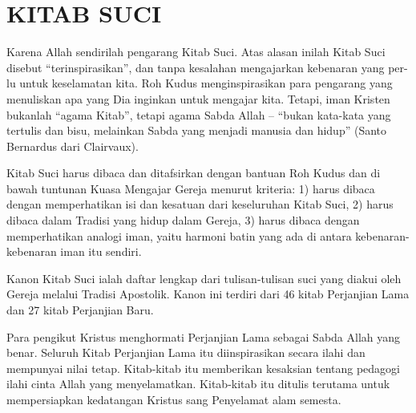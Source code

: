\newpage
{}
\setcounter{kgkcounter}{17}
{\normalsize
\section*{KITAB SUCI}

Karena Allah sendirilah pengarang Kitab Suci. Atas alasan inilah Kitab Suci
disebut ``terinspirasikan'', dan tanpa kesalahan mengajarkan kebenaran yang per-
          lu untuk keselamatan kita. Roh Kudus menginspirasikan para pengarang yang
          menuliskan apa yang Dia inginkan untuk mengajar kita. Tetapi, iman Kristen
          bukanlah ``agama Kitab'', tetapi agama Sabda Allah – ``bukan kata-kata yang tertulis
          dan bisu, melainkan Sabda yang menjadi manusia dan hidup'' (Santo Bernardus
          dari Clairvaux).

         Kitab Suci harus dibaca dan ditafsirkan dengan bantuan Roh Kudus dan di
  bawah tuntunan Kuasa Mengajar Gereja menurut kriteria: 1) harus dibaca dengan
          memperhatikan isi dan kesatuan dari keseluruhan Kitab Suci, 2) harus dibaca
          dalam Tradisi yang hidup dalam Gereja, 3) harus dibaca dengan memperhatikan
          analogi iman, yaitu harmoni batin yang ada di antara kebenaran-kebenaran iman
          itu sendiri.

Kanon Kitab Suci ialah daftar lengkap dari tulisan-tulisan suci yang diakui oleh
Gereja melalui Tradisi Apostolik. Kanon ini terdiri dari 46 kitab Perjanjian Lama
          dan 27 kitab Perjanjian Baru.

Para pengikut Kristus menghormati Perjanjian Lama sebagai Sabda Allah
          yang benar. Seluruh Kitab Perjanjian Lama itu diinspirasikan secara ilahi dan
          mempunyai nilai tetap. Kitab-kitab itu memberikan kesaksian tentang pedagogi
          ilahi cinta Allah yang menyelamatkan. Kitab-kitab itu ditulis terutama untuk
          mempersiapkan kedatangan Kristus sang Penyelamat alam semesta.


}